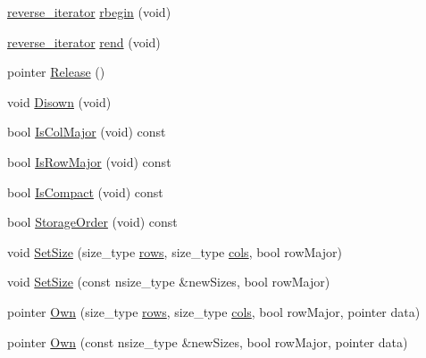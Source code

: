 \begin{DoxyCompactItemize}
\item 
\hyperlink{classvct_dynamic_matrix_owner_afa1149b71fe5f3151ee890e65ea7e81b}{reverse\+\_\+iterator} \hyperlink{classvct_dynamic_matrix_owner_a350a032e3a570318224c6f79b7b9f75e}{rbegin} (void)
\item 
\hyperlink{classvct_dynamic_matrix_owner_afa1149b71fe5f3151ee890e65ea7e81b}{reverse\+\_\+iterator} \hyperlink{classvct_dynamic_matrix_owner_aa12edc69a78d3c986faa1f95d993f870}{rend} (void)
\item 
pointer \hyperlink{classvct_dynamic_matrix_owner_ae6e16a07527b51f2da71dda44f723b93}{Release} ()
\item 
void \hyperlink{classvct_dynamic_matrix_owner_a22b66ff5225bf82493df7a1ae9aa7b1e}{Disown} (void)
\item 
bool \hyperlink{classvct_dynamic_matrix_owner_a0418023446b4f726018a01d96710a18a}{Is\+Col\+Major} (void) const 
\item 
bool \hyperlink{classvct_dynamic_matrix_owner_a79d5b06aa1235d52643fc8f4f1867aee}{Is\+Row\+Major} (void) const 
\item 
bool \hyperlink{classvct_dynamic_matrix_owner_a14868fc45649a9b6d91bdfe7f519026a}{Is\+Compact} (void) const 
\item 
bool \hyperlink{classvct_dynamic_matrix_owner_a46d599327bd4c1f8e195af6a252cb451}{Storage\+Order} (void) const 
\end{DoxyCompactItemize}
{\bf }\par
\begin{DoxyCompactItemize}
\item 
void \hyperlink{classvct_dynamic_matrix_owner_abbbe34fe0deff27167ba79860b887f1c}{Set\+Size} (size\+\_\+type \hyperlink{classvct_dynamic_matrix_owner_acbdac2c17cafa939c90536ab43a83ae6}{rows}, size\+\_\+type \hyperlink{classvct_dynamic_matrix_owner_a39b183ecd47dcfb5ca6957e390e39c4a}{cols}, bool row\+Major)
\item 
void \hyperlink{classvct_dynamic_matrix_owner_aab70106c23108e7c1f8b89c9d38e3734}{Set\+Size} (const nsize\+\_\+type \&new\+Sizes, bool row\+Major)
\end{DoxyCompactItemize}

{\bf }\par
\begin{DoxyCompactItemize}
\item 
pointer \hyperlink{classvct_dynamic_matrix_owner_a9e78e754f9739e1c9a8a987b62ab70bb}{Own} (size\+\_\+type \hyperlink{classvct_dynamic_matrix_owner_acbdac2c17cafa939c90536ab43a83ae6}{rows}, size\+\_\+type \hyperlink{classvct_dynamic_matrix_owner_a39b183ecd47dcfb5ca6957e390e39c4a}{cols}, bool row\+Major, pointer data)
\item 
pointer \hyperlink{classvct_dynamic_matrix_owner_ac3f65209b8d9b883eaf13afe2634364b}{Own} (const nsize\+\_\+type \&new\+Sizes, bool row\+Major, pointer data)
\end{DoxyCompactItemize}

